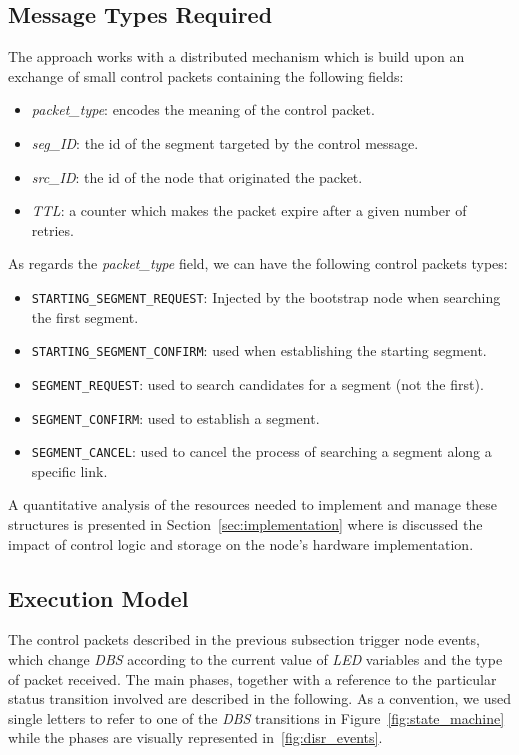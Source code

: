 \subsection{Message Types Required}

The \disr{} approach works with a distributed mechanism which is build
upon an exchange of small control packets containing the following fields:
\begin{itemize}
\item \emph{packet\_type}: encodes the meaning of the control packet.
\item \emph{seg\_ID}: the id of the segment targeted by the \disr{} control message.
\item \emph{src\_ID}: the id of the node that originated the packet.
\item \emph{TTL}: a counter which makes the packet expire after a
given number of retries.
\end{itemize}

As regards the \emph{packet\_type} field, we can have the following control packets types:
\begin{itemize}
\item{\texttt{STARTING\_SEGMENT\_REQUEST}}: Injected by the bootstrap
node when searching the first segment. 
\item{\texttt{STARTING\_SEGMENT\_CONFIRM}}: used when establishing
the starting segment. 
\item{\texttt{SEGMENT\_REQUEST}}: used to search candidates for a segment (not the first).
\item{\texttt{SEGMENT\_CONFIRM}}: used to establish a segment. 
\item{\texttt{SEGMENT\_CANCEL}}: used to cancel the process of searching a segment along a
specific link.
\end{itemize}

A quantitative analysis of the resources needed to implement and
manage these structures is presented in Section~\ref{sec:implementation} where is discussed 
the impact of \disr{} control logic and storage on the
node's hardware implementation.

\subsection{Execution Model}
\label{sub:phases}

The \disr{} control packets described in the previous subsection trigger
node events, which change \emph{DBS} according to the
current value of \emph{LED} variables and the type of packet received.
The main \disr{} phases, together with a reference to the particular
status transition involved are described in the following. As a
convention, we used single letters to refer to one of the \emph{DBS} transitions in
Figure~\ref{fig:state_machine} while the phases are visually
represented in~\ref{fig:disr_events}.

